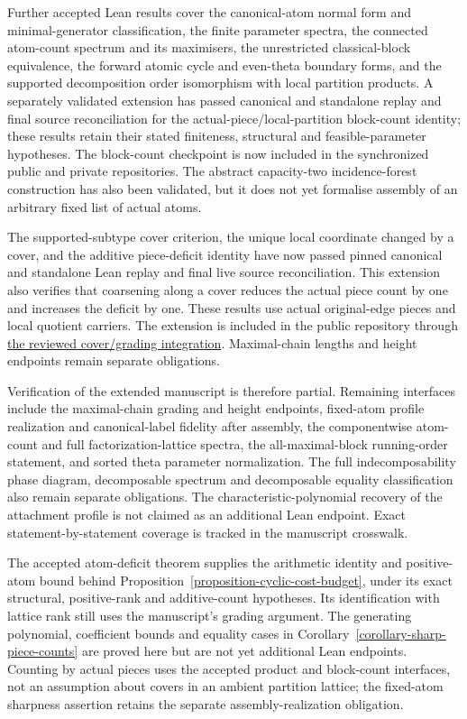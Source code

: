\documentclass[a4paper,11pt,reqno]{amsart}
\theoremstyle{plain}
\theoremstyle{definition}
\theoremstyle{remark}
\begin{document}
Further accepted Lean results cover the canonical-atom normal form and
minimal-generator classification, the finite parameter spectra, the connected atom-count
spectrum and its maximisers, the unrestricted classical-block equivalence,
the forward atomic cycle and even-theta boundary forms, and the supported
decomposition order isomorphism with local partition products.  A separately
validated extension has passed canonical and standalone replay and final
source reconciliation for the actual-piece/local-partition block-count
identity; these results retain their stated finiteness, structural and
feasible-parameter hypotheses.  The block-count checkpoint is now included
in the synchronized public and private repositories.  The abstract
capacity-two incidence-forest construction
has also been validated, but it does not yet formalise assembly of an arbitrary
fixed list of actual atoms.

The supported-subtype cover criterion, the unique local coordinate changed by
a cover, and the additive piece-deficit identity have now passed pinned
canonical and standalone Lean replay and final live source reconciliation.
This extension also verifies that coarsening along a cover reduces the actual
piece count by one and increases the deficit by one. These results use actual
original-edge pieces and local quotient carriers. The extension is included
in the public repository through
\href{https://github.com/SamPetkov/Erdos593/pull/51}{the reviewed cover/grading
integration}. Maximal-chain lengths and height endpoints
remain separate obligations.

Verification of the extended manuscript is therefore partial.  Remaining
interfaces include the maximal-chain grading and height endpoints, fixed-atom
profile realization and
canonical-label fidelity after assembly, the componentwise atom-count and full factorization-lattice
spectra, the all-maximal-block running-order statement, and sorted theta
parameter normalization.  The full indecomposability phase diagram,
decomposable spectrum and decomposable equality classification also remain
separate obligations.  The characteristic-polynomial recovery of the
attachment profile is not claimed as an additional Lean endpoint.  Exact
statement-by-statement coverage is tracked in the manuscript crosswalk.

The accepted atom-deficit theorem supplies the arithmetic identity and
positive-atom bound behind
Proposition~\ref{proposition-cyclic-cost-budget}, under its exact structural,
positive-rank and additive-count hypotheses.  Its identification with lattice
rank still uses the manuscript's grading argument.  The generating polynomial,
coefficient bounds and equality cases in
Corollary~\ref{corollary-sharp-piece-counts} are proved here but are not yet
additional Lean endpoints.  Counting by actual pieces uses the accepted
product and block-count interfaces, not an assumption about covers in an
ambient partition lattice; the fixed-atom sharpness assertion retains the
separate assembly-realization obligation.
\end{document}
